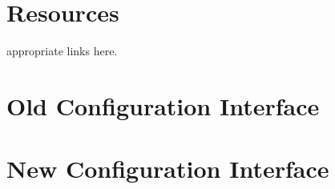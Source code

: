 \documentclass{template}
\begin{document}
\section{Resources}
{\color {red} appropriate links here.}


 

\appendix
\section*{Old Configuration Interface}
\section*{New Configuration Interface}
\end{document}
